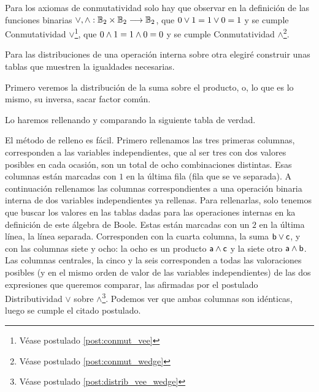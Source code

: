 	Para los axiomas de conmutatividad solo hay que observar en la definición
de las funciones binarias \(\vee,\wedge : \mathbb{B}_2 \times \mathbb{B}_2
\longrightarrow \mathbb{B}_2\), que \(0 \vee 1 = 1 \vee 0 = 1\) y se
cumple Conmutatividad $\vee$\footnote{Véase postulado \ref{post:conmut_vee}}, que \(0 \wedge 1 = 1 \wedge 0 = 0\) y se
cumple Conmutatividad $\wedge$\footnote{Véase postulado \ref{post:conmut_wedge}}. 



	Para las distribuciones de una operación interna sobre otra elegiré
construir unas tablas que muestren la igualdades necesarias.



	Primero veremos la distribución de la suma sobre el producto, o, lo que
es lo mismo, su inversa, sacar factor común. 



	Lo haremos rellenando y comparando la siguiente tabla de verdad.



	El método de relleno es fácil. Primero rellenamos las tres primeras
columnas, corresponden a las variables independientes, que al ser tres con
dos valores posibles en cada ocasión, son un total de ocho combinaciones
distintas. Esas columnas están marcadas con \(1\) en la última fila (fila que
se ve separada). A continuación rellenamos las columnas correspondientes a
una operación binaria interna de dos variables independientes ya rellenas.
Para rellenarlas, solo tenemos que buscar los valores en las tablas dadas
para las operaciones internas en ka definición de este álgebra de Boole.
Estas están marcadas con un \(2\) en la última línea, la línea separada.
Corresponden con la cuarta columna, la suma \( \textsf{b}  \vee 
\textsf{c} \), y con las columnas siete y ocho: la ocho es un producto
\(\textsf{a} \wedge \textsf{c}\) y la siete otro \( 
\textsf{a}  \wedge  \textsf{b} \). Las columnas centrales, la cinco y la seis
corresponden a todas las valoraciones posibles (y en el mismo orden de valor
de las variables independientes) de las dos expresiones que queremos
comparar, las afirmadas por el postulado Distributividad $\vee$ sobre $\wedge$\footnote{Véase postulado \ref{post:distrib_vee_wedge}}. Podemos ver que ambas
columnas son idénticas, luego se cumple el citado postulado.



